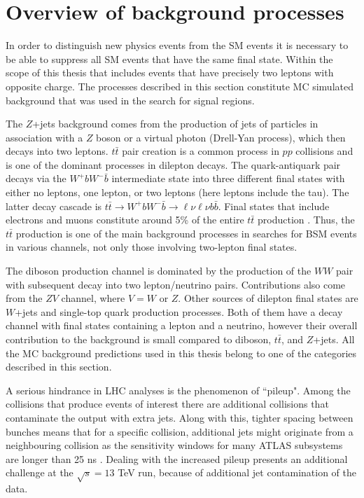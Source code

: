 \section{Overview of background processes}
In order to distinguish new physics events from the SM events it is necessary to be able to suppress all SM events that have the same final state. Within the scope of this thesis that includes events that have precisely two leptons with opposite charge. The processes described in this section constitute MC simulated background that was used in the search for signal regions.

The $Z$+jets background comes from the production of jets of particles in association with a $Z$ boson or a virtual photon (Drell-Yan process), which then decays into two leptons. $t\bar{t}$ pair creation is a common process in $pp$ collisions and is one of the dominant processes in dilepton decays. The quark-antiquark pair decays via the $W^+bW^-\bar{b}$ intermediate state into three different final states with either no leptons, one lepton, or two leptons (here leptons include the tau). The latter decay cascade is $t\bar{t} \to W^+bW^-\bar{b} \to \ell \nu \ell \nu b \bar{b}$. Final states that include electrons and muons constitute around 5\% of the entire $t\bar{t}$ production \citep{Wagner:2010wd}. Thus, the $t\bar{t}$ production is one of the main background processes in searches for BSM events in various channels, not only those involving two-lepton final states. 

The diboson production channel is dominated by the production of the $WW$ pair with subsequent decay into two lepton/neutrino pairs. Contributions also come from the $ZV$ channel, where $V = W$ or $Z$.
Other sources of dilepton final states are $W$+jets and single-top quark production processes. Both of them have a decay channel with final states containing a lepton and a neutrino, however their overall contribution to the background is small compared to diboson, $t\bar{t}$, and $Z$+jets. 
All the MC background predictions used in this thesis belong to one of the categories described in this section. 

A serious hindrance in LHC analyses is the phenomenon of ``pileup".  Among the collisions that produce events of interest there are additional collisions that contaminate the output with extra jets. Along with this, tighter spacing between bunches means that for a specific collision, additional jets might originate from a neighbouring collision as the sensitivity windows for many ATLAS subsystems are longer than 25 ns \citep{Marshall:2014mza}. Dealing with the increased pileup presents an additional challenge at the $\sqrt{s}=13$ TeV run, because of additional jet contamination of the data. 

